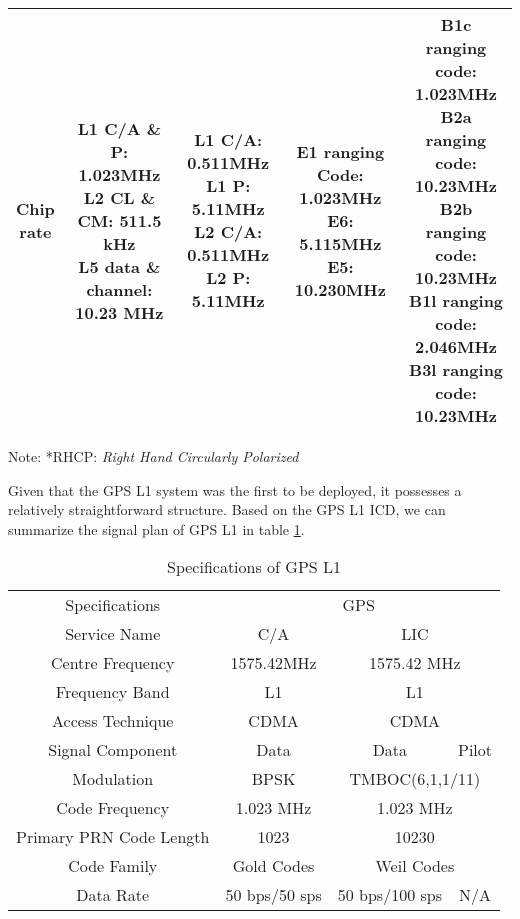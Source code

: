\begin{landscape}
\begin{center}
\begin{table}
\begin{tabular}{ccccc}
    \thead{Chip\\rate} & \thead{L1 C/A \& P: 1.023MHz\\L2 CL \& CM: 511.5 kHz\\L5 data \& channel: 10.23 MHz} & \thead{L1 C/A: 0.511MHz\\L1 P: 5.11MHz\\L2 C/A: 0.511MHz\\L2 P: 5.11MHz} & \thead{E1 ranging Code: 1.023MHz\\E6: 5.115MHz\\E5: 10.230MHz} & \thead{B1c ranging code: 1.023MHz\\B2a ranging code: 10.23MHz\\B2b ranging code: 10.23MHz\\B1l ranging code: 2.046MHz\\B3l ranging code: 10.23MHz}\\
    \bottomrule
    \end{tabular}
    \footnotesize Note: *RHCP: \textit{Right Hand Circularly Polarized}
\end{table}
\end{center}
\end{landscape}
Given that the GPS L1 system was the first to be deployed\cite{RN184}, it possesses a relatively straightforward structure. Based on the GPS L1 ICD\cite{RN170}, we can summarize the signal plan of GPS L1 in table \ref{tab:spec_gpsl1}.

\begin{table}[!htbp]
\centering
\caption{Specifications of GPS L1}\label{tab:spec_gpsl1}
\renewcommand\arraystretch{1.5}
\begin{tabular}{c@{\hspace{1.3cm}}c@{\hspace{1.3cm}}cc}
    \toprule
    Specifications & \multicolumn{3}{c}{GPS} \\
    Service Name & C/A & \multicolumn{2}{c}{LIC} \\
    \midrule
    Centre Frequency & 1575.42MHz & \multicolumn{2}{c}{1575.42 MHz} \\
    Frequency Band & L1 & \multicolumn{2}{c}{L1} \\
    Access Technique & CDMA & \multicolumn{2}{c}{CDMA} \\
    Signal Component & Data & Data & Pilot \\
    Modulation & BPSK & \multicolumn{2}{c}{TMBOC(6,1,1/11)} \\
    Code Frequency & 1.023 MHz & \multicolumn{2}{c}{1.023 MHz} \\
    Primary PRN Code Length & 1023 & \multicolumn{2}{c}{10230} \\
    Code Family & Gold Codes & \multicolumn{2}{c}{Weil Codes} \\
    Data Rate & 50 bps/50 sps & 50 bps/100 sps & N/A \\
    \bottomrule
\end{tabular}
\end{table}

